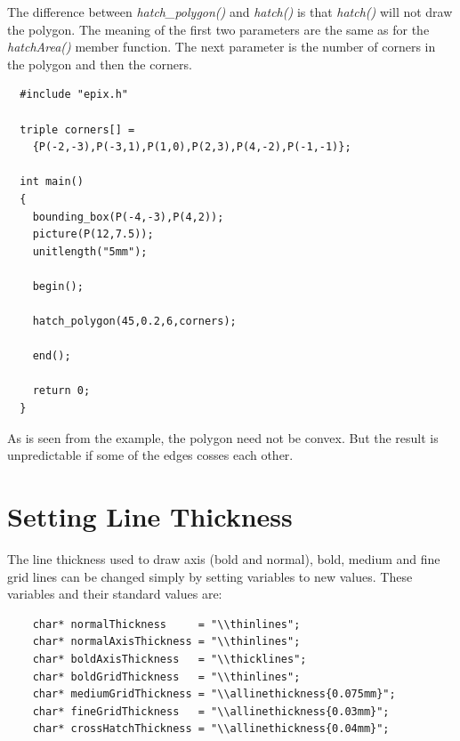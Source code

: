\documentclass[12pt,a4paper]{article}
\begin{document}
  The difference between \textit{hatch\_polygon()} and \textit{hatch()} is that
  \textit{hatch()} will not draw the polygon. The meaning of the first two
  parameters are the same as for the \textit{hatchArea()} member function. The
  next parameter is the number of corners in the polygon and then the corners.

  \begin{minipage}{7.5cm}
    \begin{lstlisting}
  #include "epix.h"

  triple corners[] =
    {P(-2,-3),P(-3,1),P(1,0),P(2,3),P(4,-2),P(-1,-1)};

  int main()
  {
    bounding_box(P(-4,-3),P(4,2));
    picture(P(12,7.5));
    unitlength("5mm");

    begin();

    hatch_polygon(45,0.2,6,corners);

    end();

    return 0;
  }
    \end{lstlisting}
  \end{minipage}
  \begin{minipage}{5.5cm}
    \vspace{1.5cm}
    
  \end{minipage}

  As is seen from the example, the polygon need not be convex. But the
  result is unpredictable if some of the edges cosses each other.

  \section{Setting Line Thickness}

  The line thickness used to draw axis (bold and normal), bold, medium and
  fine grid lines can be changed simply by setting variables to new values.
  These variables and their standard values are:

  \begin{lstlisting}
    char* normalThickness     = "\\thinlines";
    char* normalAxisThickness = "\\thinlines";
    char* boldAxisThickness   = "\\thicklines";
    char* boldGridThickness   = "\\thinlines";
    char* mediumGridThickness = "\\allinethickness{0.075mm}";
    char* fineGridThickness   = "\\allinethickness{0.03mm}";
    char* crossHatchThickness = "\\allinethickness{0.04mm}";
  \end{lstlisting}
\end{document}

